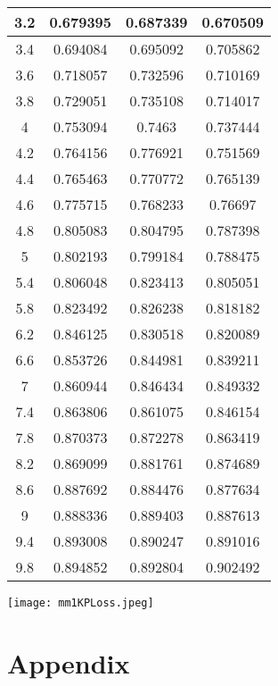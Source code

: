 \documentclass{article}
\begin{document}
\begin{enumerate}
\begin{center}
\begin{tabular}{||c c c c||}
        \hline
        3.2 & 0.679395 & 0.687339 & 0.670509 \\
        \hline
        3.4 & 0.694084 & 0.695092 & 0.705862 \\
        \hline
        3.6 & 0.718057 & 0.732596 & 0.710169 \\
        \hline
        3.8 & 0.729051 & 0.735108 & 0.714017 \\
        \hline
        4 & 0.753094 & 0.7463 & 0.737444 \\
        \hline
        4.2 & 0.764156 & 0.776921 & 0.751569 \\
        \hline
        4.4 & 0.765463 & 0.770772 & 0.765139 \\
        \hline
        4.6 & 0.775715 & 0.768233 & 0.76697 \\
        \hline
        4.8 & 0.805083 & 0.804795 & 0.787398 \\
        \hline
        5 & 0.802193 & 0.799184 & 0.788475 \\
        \hline
        5.4 & 0.806048 & 0.823413 & 0.805051 \\
        \hline
        5.8 & 0.823492 & 0.826238 & 0.818182 \\
        \hline
        6.2 & 0.846125 & 0.830518 & 0.820089 \\
        \hline
        6.6 & 0.853726 & 0.844981 & 0.839211 \\
        \hline
        7 & 0.860944 & 0.846434 & 0.849332 \\
        \hline
        7.4 & 0.863806 & 0.861075 & 0.846154 \\
        \hline
        7.8 & 0.870373 & 0.872278 & 0.863419 \\
        \hline
        8.2 & 0.869099 & 0.881761 & 0.874689 \\
        \hline
        8.6 & 0.887692 & 0.884476 & 0.877634 \\
        \hline
        9 & 0.888336 & 0.889403 & 0.887613 \\
        \hline
        9.4 & 0.893008 & 0.890247 & 0.891016 \\
        \hline
        9.8 & 0.894852 & 0.892804 & 0.902492 \\
        \hline
        \end{tabular}
    \end{center}
    \texttt{[image: mm1KPLoss.jpeg]}
\end{enumerate}


\newpage
\section{Appendix}
\end{document}
